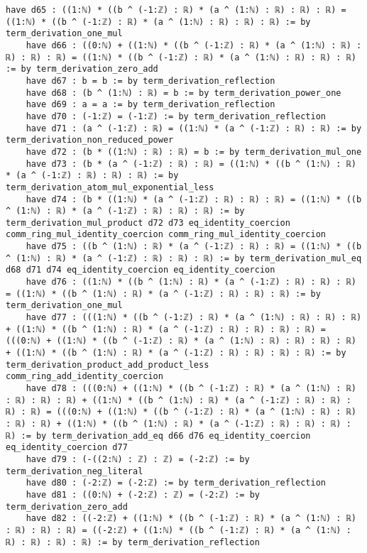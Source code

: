 \documentclass{article}
\begin{document}
\begin{tcolorbox}[colback=white!10, width=\linewidth]
\begin{lstlisting}[language=Lean4]
    have d65 : ((1:ℕ) * ((b ^ (-1:ℤ) : ℝ) * (a ^ (1:ℕ) : ℝ) : ℝ) : ℝ) = ((1:ℕ) * ((b ^ (-1:ℤ) : ℝ) * (a ^ (1:ℕ) : ℝ) : ℝ) : ℝ) := by term_derivation_one_mul
    have d66 : ((0:ℕ) + ((1:ℕ) * ((b ^ (-1:ℤ) : ℝ) * (a ^ (1:ℕ) : ℝ) : ℝ) : ℝ) : ℝ) = ((1:ℕ) * ((b ^ (-1:ℤ) : ℝ) * (a ^ (1:ℕ) : ℝ) : ℝ) : ℝ) := by term_derivation_zero_add
    have d67 : b = b := by term_derivation_reflection
    have d68 : (b ^ (1:ℕ) : ℝ) = b := by term_derivation_power_one
    have d69 : a = a := by term_derivation_reflection
    have d70 : (-1:ℤ) = (-1:ℤ) := by term_derivation_reflection
    have d71 : (a ^ (-1:ℤ) : ℝ) = ((1:ℕ) * (a ^ (-1:ℤ) : ℝ) : ℝ) := by term_derivation_non_reduced_power
    have d72 : (b * ((1:ℕ) : ℝ) : ℝ) = b := by term_derivation_mul_one
    have d73 : (b * (a ^ (-1:ℤ) : ℝ) : ℝ) = ((1:ℕ) * ((b ^ (1:ℕ) : ℝ) * (a ^ (-1:ℤ) : ℝ) : ℝ) : ℝ) := by term_derivation_atom_mul_exponential_less
    have d74 : (b * ((1:ℕ) * (a ^ (-1:ℤ) : ℝ) : ℝ) : ℝ) = ((1:ℕ) * ((b ^ (1:ℕ) : ℝ) * (a ^ (-1:ℤ) : ℝ) : ℝ) : ℝ) := by term_derivation_mul_product d72 d73 eq_identity_coercion comm_ring_mul_identity_coercion comm_ring_mul_identity_coercion
    have d75 : ((b ^ (1:ℕ) : ℝ) * (a ^ (-1:ℤ) : ℝ) : ℝ) = ((1:ℕ) * ((b ^ (1:ℕ) : ℝ) * (a ^ (-1:ℤ) : ℝ) : ℝ) : ℝ) := by term_derivation_mul_eq d68 d71 d74 eq_identity_coercion eq_identity_coercion
    have d76 : ((1:ℕ) * ((b ^ (1:ℕ) : ℝ) * (a ^ (-1:ℤ) : ℝ) : ℝ) : ℝ) = ((1:ℕ) * ((b ^ (1:ℕ) : ℝ) * (a ^ (-1:ℤ) : ℝ) : ℝ) : ℝ) := by term_derivation_one_mul
    have d77 : (((1:ℕ) * ((b ^ (-1:ℤ) : ℝ) * (a ^ (1:ℕ) : ℝ) : ℝ) : ℝ) + ((1:ℕ) * ((b ^ (1:ℕ) : ℝ) * (a ^ (-1:ℤ) : ℝ) : ℝ) : ℝ) : ℝ) = (((0:ℕ) + ((1:ℕ) * ((b ^ (-1:ℤ) : ℝ) * (a ^ (1:ℕ) : ℝ) : ℝ) : ℝ) : ℝ) + ((1:ℕ) * ((b ^ (1:ℕ) : ℝ) * (a ^ (-1:ℤ) : ℝ) : ℝ) : ℝ) : ℝ) := by term_derivation_product_add_product_less comm_ring_add_identity_coercion
    have d78 : (((0:ℕ) + ((1:ℕ) * ((b ^ (-1:ℤ) : ℝ) * (a ^ (1:ℕ) : ℝ) : ℝ) : ℝ) : ℝ) + ((1:ℕ) * ((b ^ (1:ℕ) : ℝ) * (a ^ (-1:ℤ) : ℝ) : ℝ) : ℝ) : ℝ) = (((0:ℕ) + ((1:ℕ) * ((b ^ (-1:ℤ) : ℝ) * (a ^ (1:ℕ) : ℝ) : ℝ) : ℝ) : ℝ) + ((1:ℕ) * ((b ^ (1:ℕ) : ℝ) * (a ^ (-1:ℤ) : ℝ) : ℝ) : ℝ) : ℝ) := by term_derivation_add_eq d66 d76 eq_identity_coercion eq_identity_coercion d77
    have d79 : (-((2:ℕ) : ℤ) : ℤ) = (-2:ℤ) := by term_derivation_neg_literal
    have d80 : (-2:ℤ) = (-2:ℤ) := by term_derivation_reflection
    have d81 : ((0:ℕ) + (-2:ℤ) : ℤ) = (-2:ℤ) := by term_derivation_zero_add
    have d82 : ((-2:ℤ) + ((1:ℕ) * ((b ^ (-1:ℤ) : ℝ) * (a ^ (1:ℕ) : ℝ) : ℝ) : ℝ) : ℝ) = ((-2:ℤ) + ((1:ℕ) * ((b ^ (-1:ℤ) : ℝ) * (a ^ (1:ℕ) : ℝ) : ℝ) : ℝ) : ℝ) := by term_derivation_reflection

\end{lstlisting}
\end{tcolorbox}
\end{document}
